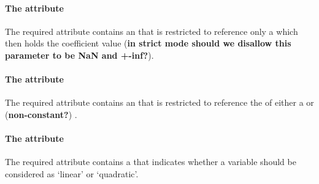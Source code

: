 \paragraph{The  attribute}
The required  attribute contains an  that is restricted to reference only a \Parameter which then holds the coefficient value (\textbf{in strict mode should we disallow this parameter to be NaN and +-inf?}).

\paragraph{The  attribute}
The required  attribute contains an  that is restricted to reference the  of either a \Reaction or (\textbf{non-constant?}) \Parameter.

\paragraph{The  attribute}
The required  attribute contains a  that indicates whether a variable should be considered as `linear' or `quadratic'.

